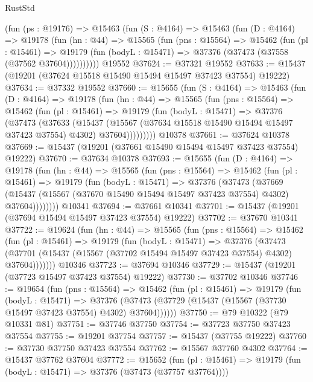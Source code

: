 \begin{lexlean}{RustStd}
\begin{coremodule}
    (fun (ps : @19176) =>
    @15463
      (fun (S : @4164) =>
      @15463
        (fun (D : @4164) =>
        @19178
          (fun (hn : @44) =>
          @15565
            (fun (pns : @15564) =>
            @15462
              (fun (pl : @15461) =>
              @19179 (fun (bodyL : @15471) => @37376 (@37473 (@37558 (@37562 @37604))))))))))
    @19552
@37624 := @37321 @19552
@37633 := @15437 (@19201 (@37624 @15518 @15490 @15494 @15497 @37423 @37554) @19222)
@37634 := @37332 @19552
@37660 := @15655
    (fun (S : @4164) =>
    @15463
      (fun (D : @4164) =>
      @19178
        (fun (hn : @44) =>
        @15565
          (fun (pns : @15564) =>
          @15462
            (fun (pl : @15461) =>
            @19179
              (fun (bodyL : @15471) =>
              @37376
                (@37473
                  (@37633
                    (@15437
                      (@15567 (@37634 @15518 @15490 @15494 @15497 @37423 @37554) @4302)
                      @37604)))))))))
    @10378
@37661 := @37624 @10378
@37669 := @15437 (@19201 (@37661 @15490 @15494 @15497 @37423 @37554) @19222)
@37670 := @37634 @10378
@37693 := @15655
    (fun (D : @4164) =>
    @19178
      (fun (hn : @44) =>
      @15565
        (fun (pns : @15564) =>
        @15462
          (fun (pl : @15461) =>
          @19179
            (fun (bodyL : @15471) =>
            @37376
              (@37473
                (@37669
                  (@15437 (@15567 (@37670 @15490 @15494 @15497 @37423 @37554) @4302) @37604))))))))
    @10341
@37694 := @37661 @10341
@37701 := @15437 (@19201 (@37694 @15494 @15497 @37423 @37554) @19222)
@37702 := @37670 @10341
@37722 := @19624
    (fun (hn : @44) =>
    @15565
      (fun (pns : @15564) =>
      @15462
        (fun (pl : @15461) =>
        @19179
          (fun (bodyL : @15471) =>
          @37376
            (@37473
              (@37701 (@15437 (@15567 (@37702 @15494 @15497 @37423 @37554) @4302) @37604)))))))
    @10346
@37723 := @37694 @10346
@37729 := @15437 (@19201 (@37723 @15497 @37423 @37554) @19222)
@37730 := @37702 @10346
@37746 := @19654
    (fun (pns : @15564) =>
    @15462
      (fun (pl : @15461) =>
      @19179
        (fun (bodyL : @15471) =>
        @37376 (@37473 (@37729 (@15437 (@15567 (@37730 @15497 @37423 @37554) @4302) @37604))))))
@37750 := @79 @10322 (@79 @10331 @81)
@37751 := @37746 @37750
@37754 := @37723 @37750 @37423 @37554
@37755 := @19201 @37754
@37757 := @15437 (@37755 @19222)
@37760 := @37730 @37750 @37423 @37554
@37762 := @15567 @37760 @4302
@37764 := @15437 @37762 @37604
@37772 := @15652
    (fun (pl : @15461) => @19179 (fun (bodyL : @15471) => @37376 (@37473 (@37757 @37764))))

\end{coremodule}
\end{lexlean}

